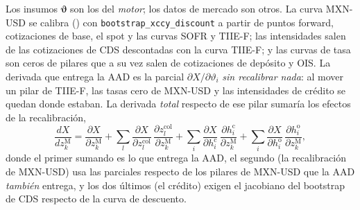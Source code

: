 \begin{sloppypar}
Los insumos $\boldsymbol\vartheta$ son los del \emph{motor}; los datos de mercado son otros. La curva MXN-USD se calibra
() con \texttt{bootstrap\_xccy\_discount} a partir de puntos forward, cotizaciones de base, el spot y las curvas
SOFR y TIIE-F; las intensidades salen de las cotizaciones de CDS descontadas con la curva TIIE-F; y las curvas de tasa
son ceros de pilares que a su vez salen de cotizaciones de depósito y OIS. La derivada que entrega la AAD es la parcial
$\partial X/\partial\vartheta_i$ \emph{sin recalibrar nada}: al mover un pilar de TIIE-F, las tasas cero de MXN-USD
y las intensidades de crédito se quedan donde estaban. La derivada \emph{total} respecto de ese pilar sumaría los
efectos de la recalibración,
\begin{equation}\label{eq:cap16-total}
  \frac{dX}{dz^{\mathrm M}_k}=\frac{\partial X}{\partial z^{\mathrm M}_k}
  +\sum_{l}\frac{\partial X}{\partial z^{\mathrm{col}}_l}\,\frac{\partial z^{\mathrm{col}}_l}{\partial z^{\mathrm M}_k}
  +\sum_{i}\frac{\partial X}{\partial h^{\mathrm c}_i}\,\frac{\partial h^{\mathrm c}_i}{\partial z^{\mathrm M}_k}
  +\sum_{i}\frac{\partial X}{\partial h^{\mathrm o}_i}\,\frac{\partial h^{\mathrm o}_i}{\partial z^{\mathrm M}_k},
\end{equation}
donde el primer sumando es lo que entrega la AAD, el segundo (la recalibración de MXN-USD) usa las parciales respecto de
los pilares de MXN-USD que la AAD \emph{también} entrega, y los dos últimos (el crédito) exigen el jacobiano del
bootstrap de CDS respecto de la curva de descuento.


\end{sloppypar}

